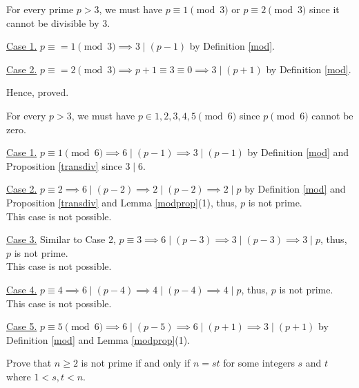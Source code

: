 \begin{solution}
	For every prime $p > 3$, we must have $p \equiv 1 \pmod{3}$ or $p \equiv 2 \pmod{3}$ since it cannot be divisible by $3$.

	\underline{Case 1.} $p \equiv = 1 \pmod{3} \implies 3 \mid (p-1)$ by Definition \ref{mod}.

	\underline{Case 2.} $p \equiv = 2 \pmod{3} \implies p+1 \equiv 3 \equiv 0 \implies 3 \mid (p+1)$ by Definition \ref{mod}.

	Hence, proved.
	\bigbreak

	For every $p > 3$, we must have $p \in {1, 2, 3, 4, 5} \pmod{6}$ since $p \pmod{6}$ cannot be zero.

	\underline{Case 1.} $p \equiv 1 \pmod{6} \implies 6 \mid (p-1) \implies 3 \mid (p-1)$ by Definition \ref{mod} and Proposition \ref{transdiv} since $3 \mid 6$.
	
	\underline{Case 2.} $p \equiv 2 \implies 6 \mid (p-2) \implies 2 \mid (p-2) \implies 2 \mid p$ by Definition \ref{mod} and Proposition \ref{transdiv} and Lemma \ref{modprop}(1), thus, $p$ is not prime. \\
	This case is not possible.

	\underline{Case 3.} Similar to Case 2, $p \equiv 3 \implies 6 \mid (p-3) \implies 3 \mid (p-3) \implies 3 \mid p$, thus, $p$ is not prime. \\
	This case is not possible.

	\underline{Case 4.} $p \equiv 4 \implies 6 \mid (p-4) \implies 4 \mid (p-4) \implies 4 \mid p$, thus, $p$ is not prime. \\
	This case is not possible.

	\underline{Case 5.} $p \equiv 5 \pmod{6} \implies 6 \mid (p-5) \implies 6 \mid (p+1) \implies 3 \mid (p+1)$ by Definition \ref{mod} and Lemma \ref{modprop}(1).
\end{solution}

\begin{problem}
	Prove that $n \geq 2$ is not prime if and only if $n = st$ for some integers $s$ and $t$ where $1 < s, t < n$.
\end{problem}

